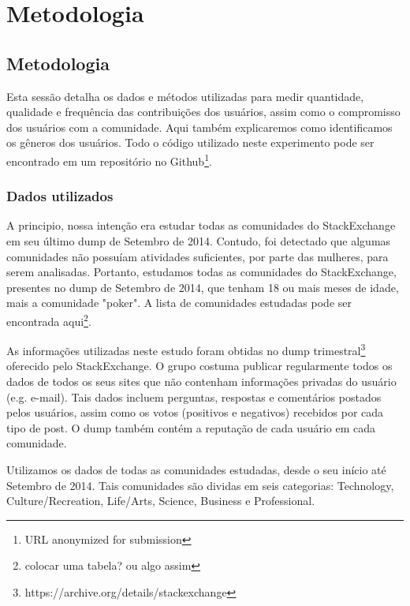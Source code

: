 \chapter{Metodologia}

\section{Metodologia} %
\label{sec:methods}

Esta sessão detalha os dados e métodos utilizadas para medir quantidade, qualidade e frequência das contribuições dos usuários, assim como o compromisso dos usuários com a comunidade. Aqui também explicaremos como identificamos os gêneros dos usuários. Todo o código utilizado neste experimento pode ser encontrado em um repositório no Github\footnote{URL anonymized for submission}. 

\subsection{Dados utilizados}

A principio, nossa intenção era estudar todas as comunidades do StackExchange em seu último dump de Setembro de 2014. Contudo, foi detectado que algumas comunidades não possuíam atividades suficientes, por parte das mulheres, para serem analisadas. Portanto, estudamos todas as comunidades do StackExchange, presentes no dump de Setembro de 2014, que tenham 18 ou mais meses de idade, mais a comunidade "poker". A lista de comunidades estudadas pode ser encontrada aqui\footnote{colocar uma tabela? ou algo assim}.

As informações utilizadas neste estudo foram obtidas no dump trimestral\footnote{https://archive.org/details/stackexchange} oferecido pelo StackExchange. O grupo costuma publicar regularmente todos os dados de todos os seus sites que não contenham informações privadas do usuário (e.g. e-mail). Tais dados incluem perguntas, respostas e comentários postados pelos usuários, assim como os votos (positivos e negativos) recebidos por cada tipo de post. O dump também contém a reputação de cada usuário em cada comunidade. 

Utilizamos os dados de todas as comunidades estudadas, desde o seu início até Setembro de 2014. Tais comunidades são dividas em seis categorias: Technology, Culture/Recreation, Life/Arts, Science, Business e Professional. %

